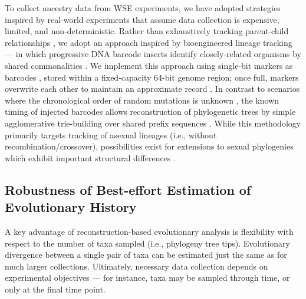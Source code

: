 
To collect ancestry data from WSE experiments, we have adopted strategies inspired by real-world experiments that assume data collection is expensive, limited, and non-deterministic.
Rather than exhaustively tracking parent-child relationships \cite{dolson2023phylotrackpy}, we adopt an approach inspired by bioengineered lineage tracking \cite{moreno2022hereditary} --- in which progressive DNA barcode inserts identify closely-related organisms by shared commonalities \cite{Masuyama2019,konno2022deep,jones2020inference,kebschull2018cellular,pan2026integrative,jones2024spatiotemporal}.
We implement this approach using single-bit markers as barcodes \cite{moreno2025testing}, stored within a fixed-capacity 64-bit genome region; once full, markers overwrite each other to maintain an approximate record \cite{moreno2024algorithms}.
In contrast to scenarios where the chronological order of random mutations is unknown \cite{gabor2017genealogical,moreno2021case},
the known timing of injected barcodes allows reconstruction of phylogenetic trees by simple agglomerative trie-building over shared prefix sequences \cite{moreno2023toward,singhvi2025scalable}.
While this methodology primarily targets tracking of asexual lineages (i.e., without recombination/crossover), possibilities exist for extensions to sexual phylogenies  \cite{moreno2024methods} which exhibit important structural differences \cite{mcphee2016using,godindubois2024apoget,burlacu2015methods}.

\vspace{-4.0ex}
\subsection{Robustness of Best-effort Estimation of Evolutionary History}
\vspace{-2.0ex}
\label{moreno:sec:case2:missing}

A key advantage of reconstruction-based evolutionary analysis is flexibility with respect to the number of taxa sampled (i.e., phylogeny tree tips).
Evolutionary divergence between a single pair of taxa can be estimated just the same as for much larger collections.
Ultimately, necessary data collection depends on experimental objectives --- for instance, taxa may be sampled through time, or only at the final time point.

